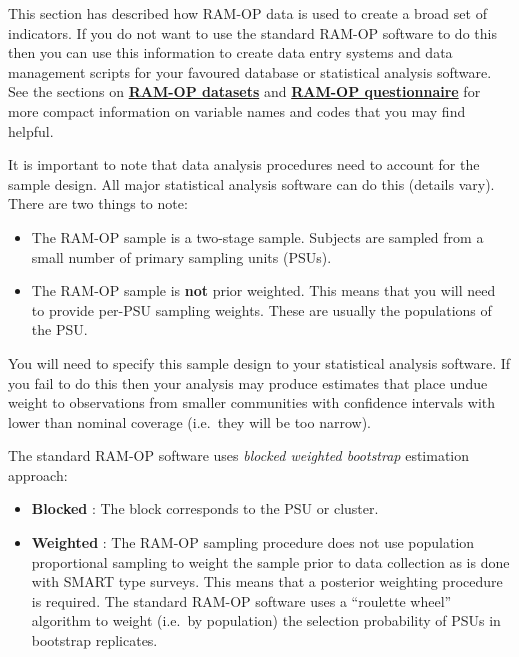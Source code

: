 \documentclass[12pt,a4paper]{book}
\providecommand{\tightlist}{%
  \setlength{\itemsep}{0pt}\setlength{\parskip}{0pt}}
\theoremstyle{definition}
\theoremstyle{definition}
\theoremstyle{definition}
\theoremstyle{remark}
\begin{document}
This section has described how RAM-OP data is used to create a broad set
of indicators. If you do not want to use the standard RAM-OP software to
do this then you can use this information to create data entry systems
and data management scripts for your favoured database or statistical
analysis software. See the sections on
\protect\hyperlink{datasets}{\textbf{RAM-OP datasets}} and
\protect\hyperlink{questionnaire}{\textbf{RAM-OP questionnaire}} for
more compact information on variable names and codes that you may find
helpful.

It is important to note that data analysis procedures need to account
for the sample design. All major statistical analysis software can do
this (details vary). There are two things to note:

\begin{itemize}
\tightlist
\item
  The RAM-OP sample is a two-stage sample. Subjects are sampled from a
  small number of primary sampling units (PSUs).
\item
  The RAM-OP sample is \textbf{not} prior weighted. This means that you
  will need to provide per-PSU sampling weights. These are usually the
  populations of the PSU.
\end{itemize}

You will need to specify this sample design to your statistical analysis
software. If you fail to do this then your analysis may produce
estimates that place undue weight to observations from smaller
communities with confidence intervals with lower than nominal coverage
(i.e.~they will be too narrow).

The standard RAM-OP software uses \emph{blocked weighted bootstrap}
estimation approach:

\begin{itemize}
\tightlist
\item
  \textbf{Blocked} : The block corresponds to the PSU or cluster.
\item
  \textbf{Weighted} : The RAM-OP sampling procedure does not use
  population proportional sampling to weight the sample prior to data
  collection as is done with SMART type surveys. This means that a
  posterior weighting procedure is required. The standard RAM-OP
  software uses a ``roulette wheel'' algorithm to weight (i.e.~by
  population) the selection probability of PSUs in bootstrap replicates.
\end{itemize}
\end{document}
